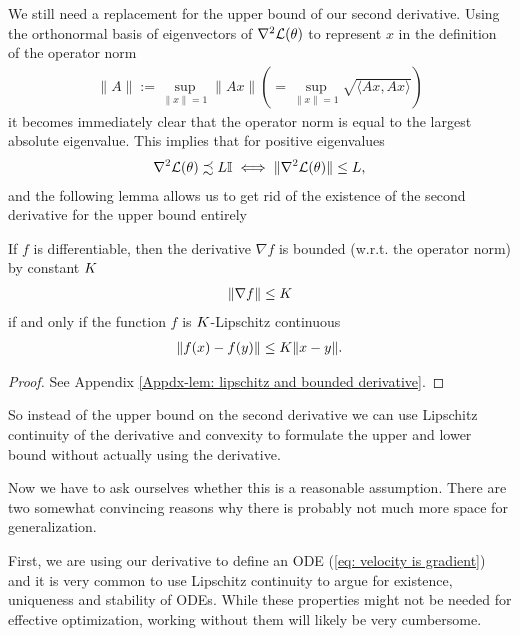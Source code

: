 We still need a replacement for the upper bound of our second derivative.
Using the orthonormal basis of eigenvectors of
\(\nabla^2 \mathcal{L}(\theta)\) to represent \(x\) in the definition of the operator norm
%
\begin{align*}
	\|A\| := \sup_{\|x\| =1} \|Ax\|
	\left(= \sup_{\|x\| =1} \sqrt{\langle Ax, Ax\rangle}\right)
\end{align*}
%
it becomes immediately clear that the operator norm is equal to the largest
absolute eigenvalue. This implies that for positive eigenvalues 
%
\begin{align}
	\label{eq: operator norm upper bound relation}
	\nabla^2 \mathcal{L}(\theta) \precsim L\mathbb{I}
	\iff \|\nabla^2 \mathcal{L}(\theta)\|\le L,
\end{align}
%
and the following lemma allows us to get rid of the existence of the second
derivative for the upper bound entirely
%
\begin{lemma}\label{lem: lipschitz and bounded derivative}
	If \(f\) is differentiable, then the derivative \(\nabla f\) is
	bounded (w.r.t. the operator norm) by constant \(K\)
	\begin{align*}
		\|\nabla f\| \le K 
	\end{align*}	
	if and only if the function
	\(f\) is \(K\)-Lipschitz continuous
	\begin{align*}
		\|f(x) - f(y)\| \le K \|x-y\|.
	\end{align*}
\end{lemma}
\begin{proof}
	See Appendix \ref{Appdx-lem: lipschitz and bounded derivative}.
\end{proof}
%
\noindent
So instead of the upper bound on the second derivative we can use Lipschitz
continuity of the derivative and convexity to formulate the upper and lower
bound without actually using the derivative.

Now we have to ask ourselves whether this  is a reasonable assumption. There
are two somewhat convincing reasons why there is probably not much more space
for generalization.

First, we are using our derivative to define an ODE (\ref{eq: velocity is
gradient}) and it is very common to use Lipschitz continuity to argue for
existence, uniqueness and stability of ODEs. While these properties might not
be needed for effective optimization, working without them will likely be very
cumbersome.

